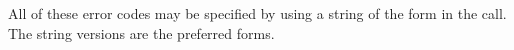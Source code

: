 All of these error codes may be specified by using a string of the
form  in the  call.  The
string versions are the preferred forms.
